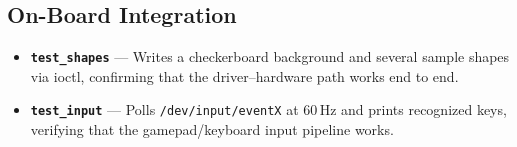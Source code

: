 \documentclass[11pt,letterpaper]{article}
\begin{document}
\subsection{On-Board Integration}

\begin{itemize}[nosep]
  \item \textbf{\texttt{test\_shapes}} --- Writes a checkerboard
    background and several sample shapes via ioctl, confirming that the
    driver--hardware path works end to end.
  \item \textbf{\texttt{test\_input}} --- Polls
    \texttt{/dev/input/eventX} at 60\,Hz and prints recognized keys,
    verifying that the gamepad/keyboard input pipeline works.
\end{itemize}

\end{document}
